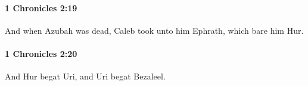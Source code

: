 		\paragraph{1 Chronicles 2:19} %
			\label{1CHRONICLES-2-19}

			And when Azubah was dead, Caleb took unto him Ephrath, which bare him Hur.


		\paragraph{1 Chronicles 2:20} %
			\label{1CHRONICLES-2-20}

			And Hur begat Uri, and Uri begat Bezaleel.


